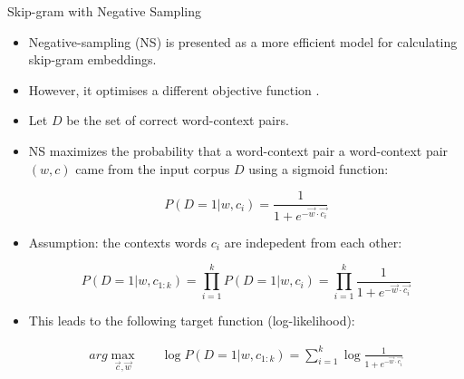 

\begin{frame}{Skip-gram with Negative Sampling}
\begin{scriptsize}
\begin{itemize}

\item Negative-sampling (NS) is presented as a more efficient model for calculating skip-gram embeddings. 
\item However, it optimises a different objective function \cite{goldberg2014word2vec}.

\item Let $D$ be the set of correct word-context pairs.

\item NS maximizes the probability that a word-context  pair a word-context pair $(w, c)$ came from the input corpus $D$ using a sigmoid function:

\begin{displaymath}
P(D = 1| w,c_i) = \frac{1}{1+e^{-\vec{w} \cdot \vec{c_{i}}}}
\end{displaymath}

\item Assumption: the contexts words $c_i$ are indepedent from each other:

\begin{displaymath}
P(D = 1| w,c_{1:k}) = \prod_{i=1}^{k}{P(D = 1| w,c_i)} = \prod_{i=1}^{k}{\frac{1}{1+e^{-\vec{w} \cdot \vec{c_{i}}}}} 
\end{displaymath}

\item This leads to the following target function (log-likelihood): 

\begin{equation}
\begin{split}
arg \max_{\vec{c}, \vec{w}} & \quad \log P(D = 1| w,c_{1:k}) = \sum_{i=1}^{k}{\log \frac{1}{1+e^{-\vec{w} \cdot \vec{c_{i}}}}}
\end{split}
\end{equation}





\end{itemize}
\end{scriptsize}
\end{frame}


